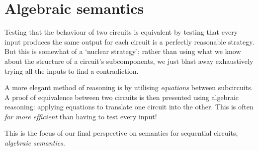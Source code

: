 \chapter{Algebraic semantics}

Testing that the behaviour of two circuits is equivalent by testing that every
input produces the same output for each circuit is a perfectly reasonable
strategy.
But this is somewhat of a `nuclear strategy'; rather than using what we know
about the structure of a circuit's subcomponents, we just blast away
exhaustively trying all the inputs to find a contradiction.

A more elegant method of reasoning is by utilising \emph{equations} between
subcircuits.
A proof of equivalence between two circuits is then presented using algebraic
reasoning: applying equations to translate one circuit into the other.
This is often \emph{far more efficient} than having to test every input!

This is the focus of our final perspective on semantics for sequential
circuits, \emph{algebraic semantics}.



